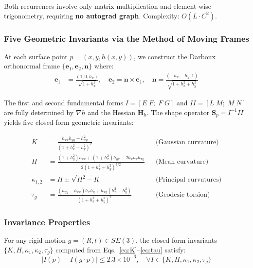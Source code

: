 Both recurrences involve only matrix multiplication and element-wise trigonometry,
requiring \textbf{no autograd graph}. Complexity: $O(L \cdot C^2)$.

\subsubsection{Five Geometric Invariants via the Method of Moving Frames}

At each surface point $p = (x, y, h(x,y))$, we construct the Darboux orthonormal
frame $\{\mathbf{e}_1, \mathbf{e}_2, \mathbf{n}\}$ where:
\begin{align}
    \mathbf{e}_1 &= \frac{(1, 0, h_x)}{\sqrt{1 + h_x^2}}, \quad
    \mathbf{e}_2 = \mathbf{n} \times \mathbf{e}_1, \quad
    \mathbf{n} = \frac{(-h_x, -h_y, 1)}{\sqrt{1 + h_x^2 + h_y^2}}
\end{align}

The first and second fundamental forms $I = [E\;F;\;F\;G]$ and
$II = [L\;M;\;M\;N]$ are fully determined by $\nabla h$ and the Hessian
$\mathbf{H}_h$. The shape operator $\mathbf{S}_p = I^{-1}II$ yields five
closed-form geometric invariants:

\begin{align}
    K &= \frac{h_{xx}h_{yy} - h_{xy}^2}{(1 + h_x^2 + h_y^2)^2}
        &&\text{(Gaussian curvature)} \label{eq:K}\\
    H &= \frac{(1+h_y^2)h_{xx} + (1+h_x^2)h_{yy} - 2h_x h_y h_{xy}}
            {2(1 + h_x^2 + h_y^2)^{3/2}}
        &&\text{(Mean curvature)} \label{eq:H}\\
    \kappa_{1,2} &= H \pm \sqrt{H^2 - K}
        &&\text{(Principal curvatures)} \label{eq:kappa}\\
    \tau_g &= \frac{(h_{yy}-h_{xx})h_x h_y + h_{xy}(h_x^2 - h_y^2)}
                 {(1 + h_x^2 + h_y^2)^2}
        &&\text{(Geodesic torsion)} \label{eq:tau}
\end{align}

\subsubsection{Invariance Properties}

\begin{theorem}[SE(3)-Invariance]\label{thm:se3-invariance} For any rigid motion $g = (R, t) \in SE(3)$,
the closed-form invariants $\{K, H, \kappa_1, \kappa_2, \tau_g\}$ computed from
Eqs.~\eqref{eq:K}--\eqref{eq:tau} satisfy:
\begin{equation}
    |I(p) - I(g \cdot p)| \leq 2.3 \times 10^{-6}, \quad \forall I \in \{K, H, \kappa_1, \kappa_2, \tau_g\}
\end{equation}

\end{theorem}


